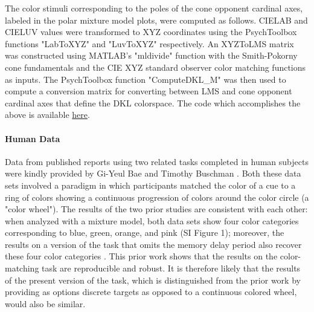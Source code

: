 \documentclass[9pt,biorxiv,lineno,onehalfspacing]{lapreprint}
\begin{document}
\begin{refsection}
The color stimuli corresponding to the poles of the cone opponent cardinal axes, labeled in the polar mixture model plots, were computed as follows. 
CIELAB and CIELUV values were transformed to XYZ coordinates using the PsychToolbox functions "LabToXYZ" and "LuvToXYZ" respectively.
An XYZToLMS matrix was constructed using MATLAB's "mldivide" function with the Smith-Pokorny cone fundamentals and the CIE XYZ standard observer color matching functions as inputs.
The PsychToolbox function "ComputeDKL\_M" was then used to compute a conversion matrix for converting between LMS and cone opponent cardinal axes that define the DKL colorspace. 
The code which accomplishes the above is available \href{https://github.com/NEI-LSR/MacaqueColorCategories/blob/main/Analyses/DKL/computeDKL_XYZ.m}{here}.

\paragraph{Human Data}

Data from published reports using two related tasks completed in human subjects were kindly provided by Gi-Yeul Bae \citep{bae_why_2015} and Timothy Buschman \citep{panichello_error-correcting_2019}.
Both these data sets involved a paradigm in which participants matched the color of a cue to a ring of colors showing a continuous progression of colors around the color circle (a "color wheel"). 
The results of the two prior studies are consistent with each other: when analyzed with a mixture model, both data sets show four color categories corresponding to blue, green, orange, and pink (SI Figure 1); moreover, the results on a version of the task that omits the memory delay period also recover these four color categories \citep{bae_why_2015}.
This prior work shows that the results on the color-matching task are reproducible and robust. 
It is therefore likely that the results of the present version of the task, which is distinguished from the prior work by providing as options discrete targets as opposed to a continuous colored wheel, would also be similar. 


\end{refsection}
\end{document}
